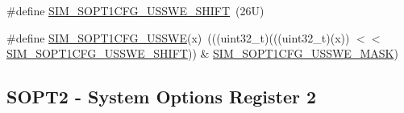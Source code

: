 \begin{DoxyCompactItemize}
\#define \mbox{\hyperlink{group___s_i_m___register___masks_ga6984c7260abd4b7caccff970332eb4be}{S\+I\+M\+\_\+\+S\+O\+P\+T1\+C\+F\+G\+\_\+\+U\+S\+S\+W\+E\+\_\+\+S\+H\+I\+FT}}~(26\+U)
\item 
\#define \mbox{\hyperlink{group___s_i_m___register___masks_ga9df9793edc59c4dbb53f488b149982d5}{S\+I\+M\+\_\+\+S\+O\+P\+T1\+C\+F\+G\+\_\+\+U\+S\+S\+WE}}(x)~(((uint32\+\_\+t)(((uint32\+\_\+t)(x)) $<$$<$ \mbox{\hyperlink{group___s_i_m___register___masks_ga6984c7260abd4b7caccff970332eb4be}{S\+I\+M\+\_\+\+S\+O\+P\+T1\+C\+F\+G\+\_\+\+U\+S\+S\+W\+E\+\_\+\+S\+H\+I\+FT}})) \& \mbox{\hyperlink{group___s_i_m___register___masks_ga0b7d9fe471d5d689ba3feb001cf69b60}{S\+I\+M\+\_\+\+S\+O\+P\+T1\+C\+F\+G\+\_\+\+U\+S\+S\+W\+E\+\_\+\+M\+A\+SK}})
\end{DoxyCompactItemize}
\subsection*{S\+O\+P\+T2 -\/ System Options Register 2}
